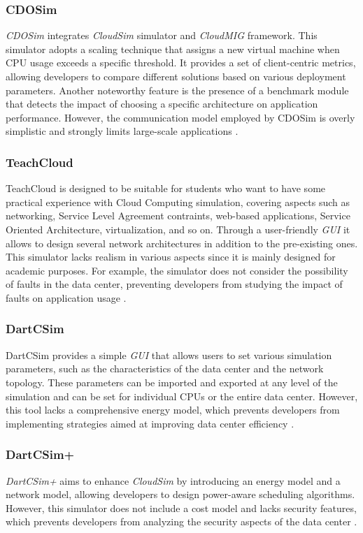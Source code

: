 {\subsubsection*{CDOSim}
\emph{CDOSim} \cite{fittkau2012cdosim} integrates \emph{CloudSim} simulator and \emph{CloudMIG} framework. This simulator adopts a scaling technique that assigns a new virtual machine when CPU usage exceeds a specific threshold.  It provides a set of client-centric metrics, allowing developers to compare different solutions based on various deployment parameters. Another noteworthy feature is the presence of a benchmark module that detects the impact of choosing a specific architecture on application performance. However, the communication model employed by CDOSim is overly simplistic and strongly limits large-scale applications \cite{mansouri2020cloud}.
\subsubsection*{TeachCloud}
TeachCloud \cite{jararweh2013teachcloud} is designed to be suitable for students who want to have some practical experience with Cloud Computing simulation, covering aspects such as networking, Service Level Agreement contraints, web-based applications, Service Oriented Architecture, virtualization, and so on. Through a user-friendly \emph{GUI} it allows to design several network architectures in addition to the pre-existing ones. This simulator lacks realism in various aspects since it is mainly designed for academic purposes. For example, the simulator does not consider the possibility of faults in the data center, preventing developers from studying the impact of faults on application usage \cite{mansouri2020cloud} \cite{patel2016comprehensive}.
\subsubsection*{DartCSim}
DartCSim \cite{li2012dartcsim} provides a simple \emph{GUI} that allows users to set various simulation parameters, such as the characteristics of the data center and the network topology. These parameters can be imported and exported at any level of the simulation and can be set for individual CPUs or the entire data center. However, this tool lacks a comprehensive energy model, which prevents developers from implementing strategies aimed at improving data center efficiency \cite{mansouri2020cloud}.
\subsubsection*{DartCSim+}
\emph{DartCSim+} \cite{li2013dartcsim+} aims to enhance \emph{CloudSim} by introducing an energy model and a network model, allowing developers to design power-aware scheduling algorithms. However, this simulator does not include a cost model and lacks security features, which prevents developers from analyzing the security aspects of the data center \cite{mansouri2020cloud}.
}
